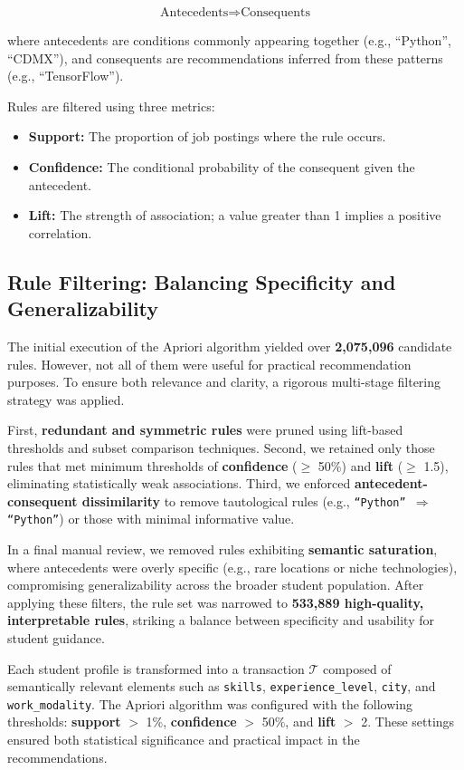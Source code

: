 \documentclass[runningheads]{llncs}
\begin{document}
	\[
	\text{Antecedents} \Rightarrow \text{Consequents}
	\]
	
	where antecedents are conditions commonly appearing together (e.g., ``Python'', ``CDMX''), and consequents are recommendations inferred from these patterns (e.g., ``TensorFlow'').
	
	Rules are filtered using three metrics:
	\begin{itemize}
		\item \textbf{Support:} The proportion of job postings where the rule occurs.
		\item \textbf{Confidence:} The conditional probability of the consequent given the antecedent.
		\item \textbf{Lift:} The strength of association; a value greater than 1 implies a positive correlation.
	\end{itemize}
	
	\subsection{Rule Filtering: Balancing Specificity and Generalizability}
	
	The initial execution of the Apriori algorithm yielded over \textbf{2,075,096} candidate rules. However, not all of them were useful for practical recommendation purposes. To ensure both relevance and clarity, a rigorous multi-stage filtering strategy was applied.
	
	First, \textbf{redundant and symmetric rules} were pruned using lift-based thresholds and subset comparison techniques. Second, we retained only those rules that met minimum thresholds of \textbf{confidence} ($\geq$ 50\%) and \textbf{lift} ($\geq$ 1.5), eliminating statistically weak associations. Third, we enforced \textbf{antecedent-consequent dissimilarity} to remove tautological rules (e.g., \texttt{“Python” $\Rightarrow$ “Python”}) or those with minimal informative value.
	
	In a final manual review, we removed rules exhibiting \textbf{semantic saturation}, where antecedents were overly specific (e.g., rare locations or niche technologies), compromising generalizability across the broader student population. After applying these filters, the rule set was narrowed to \textbf{533,889 high-quality, interpretable rules}, striking a balance between specificity and usability for student guidance.
	
	Each student profile is transformed into a transaction $\mathcal{T}$ composed of semantically relevant elements such as \texttt{skills}, \texttt{experience\_level}, \texttt{city}, and \texttt{work\_modality}. The Apriori algorithm was configured with the following thresholds: \textbf{support} $>$ 1\%, \textbf{confidence} $>$ 50\%, and \textbf{lift} $>$ 2. These settings ensured both statistical significance and practical impact in the recommendations.
	
\end{document}
